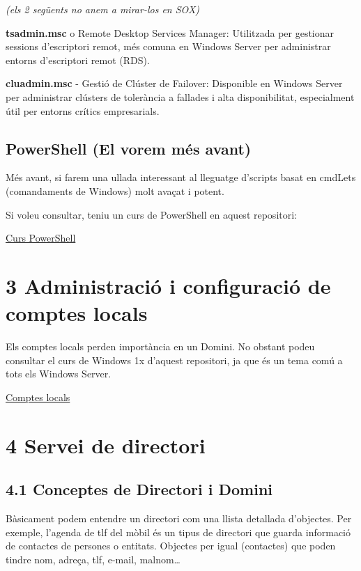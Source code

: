 \documentclass[
  a4paper,
]{article}
\begin{document}
\emph{(els 2 següents no anem a mirar-los en SOX)}

\textbf{tsadmin.msc} o Remote Desktop Services Manager: Utilitzada per
gestionar sessions d'escriptori remot, més comuna en Windows Server per
administrar entorns d'escriptori remot (RDS).

\textbf{cluadmin.msc} - Gestió de Clúster de Failover: Disponible en
Windows Server per administrar clústers de tolerància a fallades i alta
disponibilitat, especialment útil per entorns crítics empresarials.

\subsection{PowerShell (El vorem més
avant)}\label{powershell-el-vorem-muxe9s-avant}

Més avant, si farem una ullada interessant al lleguatge d'scripts basat
en cmdLets (comandaments de Windows) molt avaçat i potent.

Si voleu consultar, teniu un curs de PowerShell en aquest repositori:

\href{https://github.com/tofermos/PowerShell}{Curs PowerShell}

\section{3 Administració i configuració de comptes
locals}\label{administraciuxf3-i-configuraciuxf3-de-comptes-locals}

Els comptes locals perden importància en un Domini. No obstant podeu
consultar el curs de Windows 1x d'aquest repositori, ja que és un tema
comú a tots els Windows Server.

\href{https://tofermos.github.io/Windows11/gestions/comptesLocals.html}{Comptes
locals}

\section{4 Servei de directori}\label{servei-de-directori}

\subsection{4.1 Conceptes de Directori i
Domini}\label{conceptes-de-directori-i-domini}

Bàsicament podem entendre un directori com una llista detallada
d'objectes. Per exemple, l'agenda de tlf del mòbil és un tipus de
directori que guarda informació de contactes de persones o entitats.
Objectes per igual (contactes) que poden tindre nom, adreça, tlf,
e-mail, malnom\ldots{}
\end{document}
